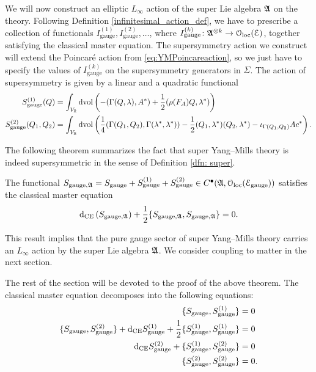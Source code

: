 \documentclass[10pt, oneside]{article}
\newcommand{\gauge}{\mathrm{gauge}}
\begin{document}
We will now construct an elliptic $L_\infty$ action of the super Lie algebra $\mathfrak{A}$ on the theory. Following Definition \ref{infinitesimal_action_def}, we have to prescribe a collection of functionals $I_{\gauge}^{(1)}, I_{\gauge}^{(2)}, \dots$, where $I_{\gauge}^{(k)}\colon \mf{A}^{\otimes k}\rightarrow \oloc(\cE)$, together satisfying the classical master equation. The supersymmetry action we construct will extend the Poincar\'{e} action from \eqref{eq:YMPoincareaction}, so we just have to specify the values of $I_{\gauge}^{(k)}$ on the supersymmetry generators in $\Sigma$. The action of supersymmetry is given by a linear and a quadratic functional
\begin{align}
S_{\gauge}^{(1)}(Q) &= \int_{V_\RR}\dvol\left( -(\Gamma(Q, \lambda), A^*) + \frac{1}{2}(\rho(F_A)Q, \lambda^*)\right) \label{eq:gaugeI1} \\
S_{\gauge}^{(2)}(Q_1, Q_2) &= \int_{V_\RR}\dvol\left( \frac{1}{4}(\Gamma(Q_1, Q_2), \Gamma(\lambda^*, \lambda^*)) - \frac{1}{2}(Q_1, \lambda^*)(Q_2, \lambda^*) - \iota_{\Gamma(Q_1, Q_2)} A c^*\right). \label{eq:gaugeI2}
\end{align}

The following theorem summarizes the fact that super Yang--Mills theory is indeed supersymmetric in the sense of Definition \ref{dfn: super}. 

\begin{theorem}\label{thm:gaugemultipletSUSY}
The functional $S_{\gauge, \fA} = S_{\gauge} + S_{\gauge}^{(1)} + S_{\gauge}^{(2)} \in C^\bu(\mf{A}, \oloc(\cE_{\gauge}))$ satisfies the classical master equation
\[\d_{\mr{CE}} \left(S_{\gauge, \fA}\right) + \frac{1}{2}\{S_{\gauge, \fA}, S_{\gauge, \fA}\} = 0.\]
\end{theorem}

This result implies that the pure gauge sector of super Yang--Mills theory carries an $L_\infty$ action by the super Lie algebra $\mathfrak A$.
We consider coupling to matter in the next section.

The rest of the section will be devoted to the proof of the above theorem. The classical master equation decomposes into the following equations:
\begin{align*}
\{S_{\gauge}, S_{\gauge}^{(1)}\} &= 0 \\
\{S_{\gauge}, S_{\gauge}^{(2)}\} + \d_{\mr{CE}} S_{\gauge}^{(1)} + \frac{1}{2}\{S_{\gauge}^{(1)}, S_{\gauge}^{(1)}\} &= 0 \\
\d_{\mr{CE}} S_{\gauge}^{(2)} + \{S_{\gauge}^{(1)}, S_{\gauge}^{(2)}\} &= 0 \\
\{S_{\gauge}^{(2)}, S_{\gauge}^{(2)}\} &= 0.
\end{align*}
\end{document}
